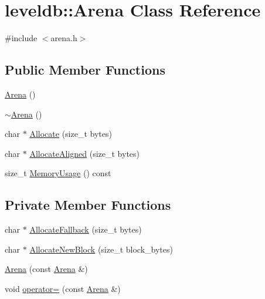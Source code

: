 \hypertarget{classleveldb_1_1_arena}{\section{leveldb\-:\-:Arena Class Reference}
\label{classleveldb_1_1_arena}
}


{\ttfamily \#include $<$arena.\-h$>$}

\subsection*{Public Member Functions}
\begin{DoxyCompactItemize}
\item 
\hyperlink{classleveldb_1_1_arena_a612fe3668024ddf7b92f632afa1361ca}{Arena} ()
\item 
\hyperlink{classleveldb_1_1_arena_a39130691c948dec339cd4649b39c965c}{$\sim$\-Arena} ()
\item 
char $\ast$ \hyperlink{classleveldb_1_1_arena_add4bc4b1c8fdf5be7a96a7ec00a0732e}{Allocate} (size\-\_\-t bytes)
\item 
char $\ast$ \hyperlink{classleveldb_1_1_arena_a9c1e8e695fe25ac96063f9fbacefee9e}{Allocate\-Aligned} (size\-\_\-t bytes)
\item 
size\-\_\-t \hyperlink{classleveldb_1_1_arena_aaf8db075d5d1130106bbbf66b1d267b2}{Memory\-Usage} () const 
\end{DoxyCompactItemize}
\subsection*{Private Member Functions}
\begin{DoxyCompactItemize}
\item 
char $\ast$ \hyperlink{classleveldb_1_1_arena_ae2769aced236a3e28f0f6414f0a604d0}{Allocate\-Fallback} (size\-\_\-t bytes)
\item 
char $\ast$ \hyperlink{classleveldb_1_1_arena_afb0a6d9d349dcc35ff0a0214062ebac8}{Allocate\-New\-Block} (size\-\_\-t block\-\_\-bytes)
\item 
\hyperlink{classleveldb_1_1_arena_a83bcebfd75ada453cebe554675046500}{Arena} (const \hyperlink{classleveldb_1_1_arena}{Arena} \&)
\item 
void \hyperlink{classleveldb_1_1_arena_a1ac27375d43dd5378aabea3f73108ca2}{operator=} (const \hyperlink{classleveldb_1_1_arena}{Arena} \&)
\end{DoxyCompactItemize}
